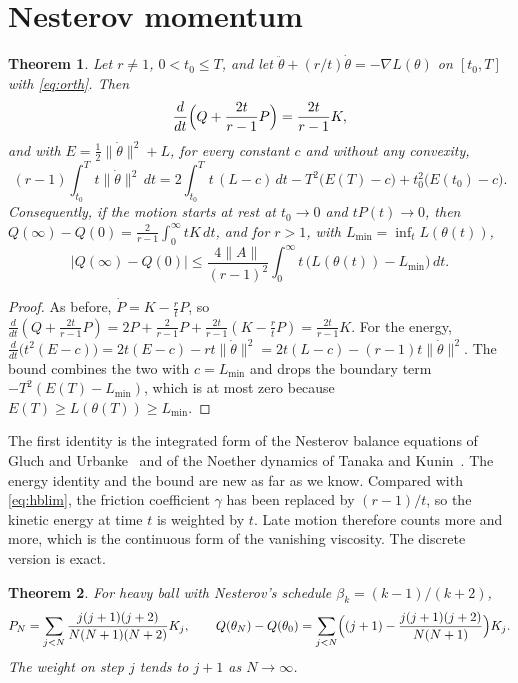 \documentclass[11pt]{article}
\newtheorem{theorem}{Theorem}
\theoremstyle{remark}
\theoremstyle{definition}
\begin{document}
\section{Nesterov momentum}\label{sec:nest}

\begin{theorem}\label{thm:nest}
Let $r\ne1$, $0<t_0\le T$, and let $\ddot\theta+(r/t)\dot\theta=-\nabla L(\theta)$ on $[t_0,T]$ with \eqref{eq:orth}. Then
\[
\frac{d}{dt}\Bigl(Q+\frac{2t}{r-1}P\Bigr)=\frac{2t}{r-1}K ,
\]
and with $E=\frac12\|\dot\theta\|^2+L$, for every constant $c$ and without any convexity,
\[
(r-1)\int_{t_0}^Tt\|\dot\theta\|^2\,dt=2\int_{t_0}^Tt\,(L-c)\,dt-T^2\bigl(E(T)-c\bigr)+t_0^2\bigl(E(t_0)-c\bigr).
\]
Consequently, if the motion starts at rest at $t_0\to0$ and $tP(t)\to0$, then $Q(\infty)-Q(0)=\frac{2}{r-1}\int_0^\infty tK\,dt$, and for $r>1$, with $L_{\min}=\inf_tL(\theta(t))$,
\[
|Q(\infty)-Q(0)|\le\frac{4\|A\|}{(r-1)^2}\int_0^\infty t\,\bigl(L(\theta(t))-L_{\min}\bigr)\,dt .
\]
\end{theorem}

\begin{proof}
As before, $\dot P=K-\frac rtP$, so $\frac{d}{dt}(Q+\frac{2t}{r-1}P)=2P+\frac{2}{r-1}P+\frac{2t}{r-1}(K-\frac rtP)=\frac{2t}{r-1}K$. For the energy, $\frac{d}{dt}\bigl(t^2(E-c)\bigr)=2t(E-c)-rt\|\dot\theta\|^2=2t(L-c)-(r-1)t\|\dot\theta\|^2$. The bound combines the two with $c=L_{\min}$ and drops the boundary term $-T^2(E(T)-L_{\min})$, which is at most zero because $E(T)\ge L(\theta(T))\ge L_{\min}$.
\end{proof}

The first identity is the integrated form of the Nesterov balance equations of Gluch and Urbanke~\cite{gluch2021} and of the Noether dynamics of Tanaka and Kunin~\cite{tanaka2021}. The energy identity and the bound are new as far as we know. Compared with \eqref{eq:hblim}, the friction coefficient $\gamma$ has been replaced by $(r-1)/t$, so the kinetic energy at time $t$ is weighted by $t$. Late motion therefore counts more and more, which is the continuous form of the vanishing viscosity. The discrete version is exact.

\begin{theorem}\label{thm:nestdisc}
For heavy ball with Nesterov's schedule $\beta_k=(k-1)/(k+2)$,
\[
P_N=\sum_{j<N}\frac{j(j+1)(j+2)}{N(N+1)(N+2)}K_j,\qquad
Q(\theta_N)-Q(\theta_0)=\sum_{j<N}\Bigl((j+1)-\frac{j(j+1)(j+2)}{N(N+1)}\Bigr)K_j .
\]
The weight on step $j$ tends to $j+1$ as $N\to\infty$.
\end{theorem}
\end{document}
